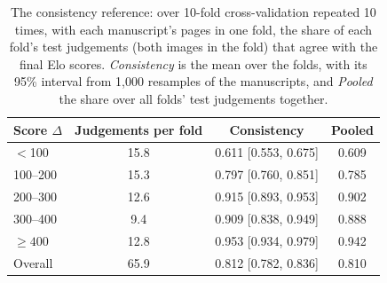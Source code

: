 \begin{table}[htbp]
  \centering
  \caption{The consistency reference: over 10-fold cross-validation repeated 10 times, with each manuscript's pages in one fold, the share of each fold's test judgements (both images in the fold) that agree with the final Elo scores. \emph{Consistency} is the mean over the folds, with its 95\% interval from 1,000 resamples of the manuscripts, and \emph{Pooled} the share over all folds' test judgements together.}
  \label{tab:consistency_reference_by_fold}
  \begin{tabular}{lccc}
    \toprule
    Score $\Delta$ & Judgements per fold & Consistency & Pooled \\
    \midrule
    $<$100 & 15.8 & 0.611 [0.553, 0.675] & 0.609 \\
    100--200 & 15.3 & 0.797 [0.760, 0.851] & 0.785 \\
    200--300 & 12.6 & 0.915 [0.893, 0.953] & 0.902 \\
    300--400 & 9.4 & 0.909 [0.838, 0.949] & 0.888 \\
    $\geq 400$ & 12.8 & 0.953 [0.934, 0.979] & 0.942 \\
    \midrule
    Overall & 65.9 & 0.812 [0.782, 0.836] & 0.810 \\
    \bottomrule
  \end{tabular}
\end{table}
